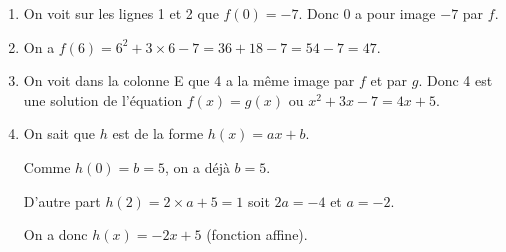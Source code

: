 
\medskip
 
%
%

\begin{enumerate}
\item %
On voit sur les lignes 1 et 2 que $f(0) = - 7$. Donc $0$ a pour image $- 7$ par $f$. 
\item %
On a $f(6) = 6^2 + 3 \times 6 - 7 = 36 + 18 - 7 = 54 - 7 = 47$. 
\item %
On voit dans la colonne E que 4 a la même image par $f$ et par $g$. Donc 4 est une solution de l'équation $f(x) = g(x)$ ou  $x^2+ 3x - 7 =  4x + 5$.
\item %
On sait que $h$ est de la forme $h(x) = ax + b$.

Comme $h(0) = b = 5$, on a déjà $b = 5$.

D'autre part $h(2) = 2 \times a + 5 = 1$ soit $2a = - 4$ et $a = - 2$.

On a donc $h(x) = -2x + 5$ (fonction affine).
\end{enumerate}

\bigskip

